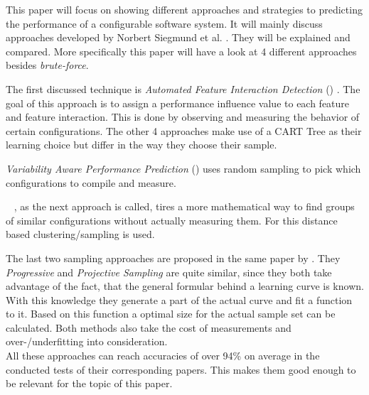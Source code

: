 \newpage\noindent
This paper will focus on showing different approaches and strategies to predicting the performance of a configurable software system. It will mainly discuss approaches developed by Norbert Siegmund et al. \cite{AutomatedFeatureDetectionSiegmund2012,VariabilityAwarePerformancePredictionJianmeiSigmundApel,CostEfficientSampling_Gou_Siegmund_2015, DistanceBasedSampling2019}. They will be explained and compared. More specifically this paper will have a look at 4 different approaches besides \textit{brute-force}.

The first discussed technique is \textit{Automated Feature Interaction Detection} (\AFID) \cite{AutomatedFeatureDetectionSiegmund2012}. The goal of this approach is to assign a performance influence value to each feature and feature interaction. This is done by observing and measuring the behavior of certain configurations. 
The other 4 approaches make use of a CART Tree as their learning choice but differ in the way they choose their sample.
 
\textit{Variability Aware Performance Prediction} (\VAPP) \cite{VariabilityAwarePerformancePredictionJianmeiSigmundApel} uses random sampling to pick which configurations to compile and measure. 

\WHAT~ \cite{DistanceBasedSampling2019}, as the next approach is called, tires a more mathematical way to find groups of similar configurations without actually measuring them. For this distance based clustering/sampling is used. 

The last two sampling approaches are proposed in the same paper by \citet{CostEfficientSampling_Gou_Siegmund_2015}. They \textit{Progressive} and \textit{Projective Sampling} are quite similar, since they both take advantage of the fact, that the general formular behind a learning curve is known. With this knowledge they generate a part of the actual curve and fit a function to it. Based on this function a optimal size for the actual sample set can be calculated. Both methods also take the cost of measurements and over-/underfitting into consideration.\\
All these approaches can reach accuracies of over 94\% on average in the conducted tests of their corresponding papers. This makes them good enough to be relevant for the topic of this paper.